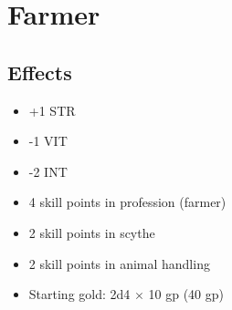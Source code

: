 \section{Farmer}\label{background:farmer}

\subsection{Effects}
\begin{itemize}
    \item +1 STR
    \item -1 VIT
    \item -2 INT
    \item 4 skill points in profession (farmer)
    \item 2 skill points in scythe
    \item 2 skill points in animal handling
    \item Starting gold: 2d4 $\times$ 10 gp (40 gp)
\end{itemize}
